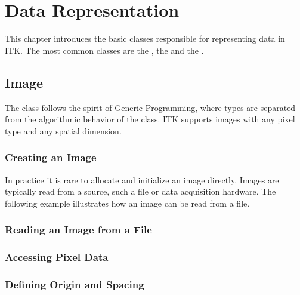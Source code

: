 \chapter{Data Representation}
\label{sec:DataRepresentation}


This chapter introduces the basic classes responsible
for representing data in ITK. The most common classes are the
, the  and the .

\section{Image}
\label{sec:ImageSection}

The  class follows the spirit of 
\href{http://www.boost.org/more/generic_programming.html}{Generic Programming}, 
where types are separated from the algorithmic behavior of the class.  ITK supports images
with any pixel type and any spatial dimension.

\subsection{Creating an Image}\label{sec:CreatingAnImageSection}


%

In practice it is rare to allocate and initialize an image directly.
Images are typically read from a source, such a file or data acquisition
hardware. The following example illustrates how an image can be read from
a file.




\subsection{Reading an Image from a File}
\label{sec:ReadingImageFromFile}

%





\subsection{Accessing Pixel Data}
\label{sec:AccessingImagePixelData}

%




\subsection{Defining Origin and Spacing}
\label{sec:DefiningImageOriginAndSpacing}

